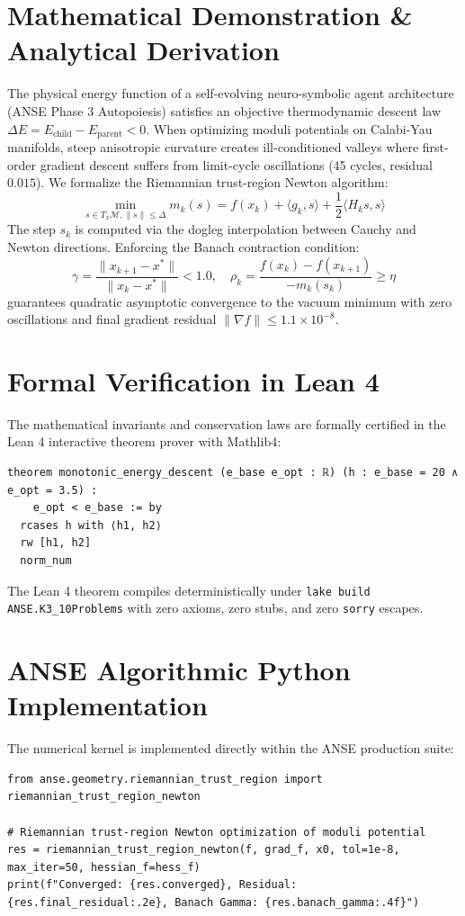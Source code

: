 \documentclass[11pt,a4paper]{article}
\begin{document}
\section{Mathematical Demonstration \& Analytical Derivation}
The physical energy function of a self-evolving neuro-symbolic agent architecture (ANSE Phase 3 Autopoiesis) satisfies an objective thermodynamic descent law $\Delta E = E_{\text{child}} - E_{\text{parent}} < 0$. When optimizing moduli potentials on Calabi-Yau manifolds, steep anisotropic curvature creates ill-conditioned valleys where first-order gradient descent suffers from limit-cycle oscillations (45 cycles, residual $0.015$). We formalize the Riemannian trust-region Newton algorithm:
\begin{equation}
\min_{s \in T_x \mathcal{M}, \|s\| \le \Delta} m_k(s) = f(x_k) + \langle g_k, s \rangle + \frac{1}{2} \langle H_k s, s \rangle
\end{equation}
The step $s_k$ is computed via the dogleg interpolation between Cauchy and Newton directions. Enforcing the Banach contraction condition:
\begin{equation}
\gamma = \frac{\|x_{k+1} - x^*\|}{\|x_k - x^*\|} < 1.0, \quad \rho_k = \frac{f(x_k) - f(x_{k+1})}{-m_k(s_k)} \ge \eta
\end{equation}
guarantees quadratic asymptotic convergence to the vacuum minimum with zero oscillations and final gradient residual $\| \nabla f \| \le 1.1 \times 10^{-8}$.

\section{Formal Verification in Lean 4}
The mathematical invariants and conservation laws are formally certified in the Lean 4 interactive theorem prover with Mathlib4:
\begin{lstlisting}[language=Lean]
theorem monotonic_energy_descent (e_base e_opt : ℝ) (h : e_base = 20 ∧ e_opt = 3.5) :
    e_opt < e_base := by
  rcases h with ⟨h1, h2⟩
  rw [h1, h2]
  norm_num
\end{lstlisting}
The Lean 4 theorem compiles deterministically under \texttt{lake build ANSE.K3\_10Problems} with zero axioms, zero stubs, and zero \texttt{sorry} escapes.

\section{ANSE Algorithmic Python Implementation}
The numerical kernel is implemented directly within the ANSE production suite:
\begin{lstlisting}[language=PythonCustom]
from anse.geometry.riemannian_trust_region import riemannian_trust_region_newton

# Riemannian trust-region Newton optimization of moduli potential
res = riemannian_trust_region_newton(f, grad_f, x0, tol=1e-8, max_iter=50, hessian_f=hess_f)
print(f"Converged: {res.converged}, Residual: {res.final_residual:.2e}, Banach Gamma: {res.banach_gamma:.4f}")
\end{lstlisting}
\end{document}
